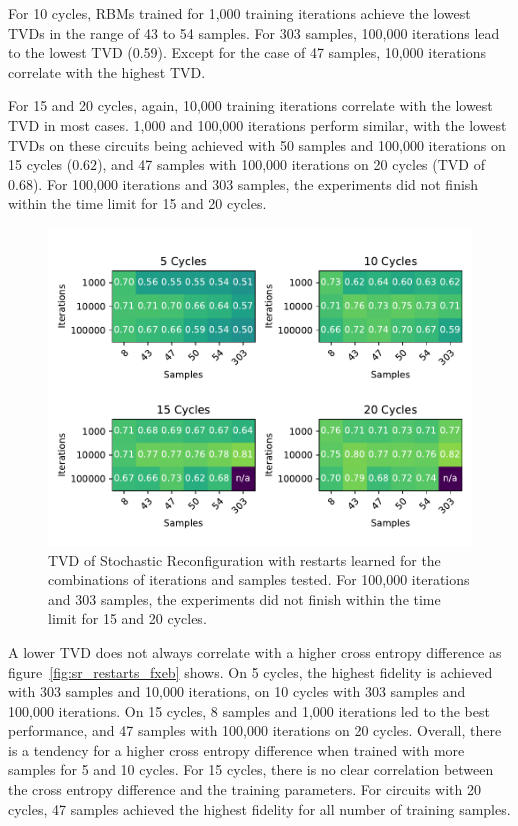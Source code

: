 For 10 cycles, RBMs trained for 1,000 training iterations achieve the lowest TVDs in the range of 43 to 
54 samples. For 303 samples, 100,000 iterations lead to the lowest TVD (0.59). Except for the 
case of 47 samples, 10,000 iterations correlate with the highest TVD.

For 15 and 20 cycles, again, 10,000 training iterations correlate with the lowest TVD in most cases. 1,000
and 100,000 iterations perform similar, with the lowest TVDs on these circuits being achieved with 50 samples and 
100,000 iterations on 15 cycles ($0.62$), and 47 samples with 100,000 iterations on 20 cycles (TVD of $0.68$).
For 100,000 iterations and 303 samples, the experiments did not finish within the time limit for 15 and 20 cycles.

\begin{figure}[H]
  \centering
  \includegraphics[width=\textwidth]{figures/results/SR-restarts-learned/tvd_heatmap.pdf}
  \caption[TVD of RBMs Trained with Stochastic Reconfiguration with Random Restarts and $CZ$ Gates Learned]{TVD of Stochastic 
  Reconfiguration with restarts learned for the combinations of iterations and samples tested.
  For 100,000 iterations and 303 samples, the experiments did not finish within the time limit for 15 and 20 cycles.}
  \label{fig:sr_restarts_tvd}
\end{figure}

A lower TVD does not always correlate with a higher cross entropy difference as figure~\ref{fig:sr_restarts_fxeb}
shows. On 5 cycles, the highest fidelity is achieved with 303 samples and 10,000 iterations, on 10 cycles 
with 303 samples and 100,000 iterations. On 15 cycles, 8 samples and 1,000 iterations led to the best performance, 
and 47 samples with 100,000 iterations on 20 cycles. Overall, there is a tendency for a higher cross entropy difference 
when trained with more samples for 5 and 10 cycles. For 15 cycles, there is no clear correlation between the 
cross entropy difference and the training parameters. For circuits with 20 cycles, 47 samples achieved the highest 
fidelity for all number of training samples.

